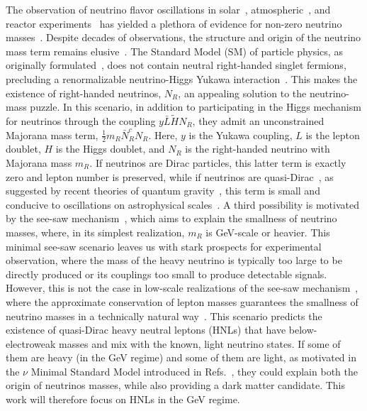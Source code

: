 \documentclass[
    aps,
    prd,
    reprint,
    amsmath,
    amssymb,
    nofootinbib,
    superscriptaddress,
    floatfix
]{revtex4-2}
\begin{document}
The observation of neutrino flavor oscillations in solar~\cite{Cleveland:1998nv, Super-Kamiokande:2001ljr, Borexino:2008dzn, Gann:2021ndb}, atmospheric~\cite{Super-Kamiokande:1998kpq, IceCube:2013pav, ANTARES:2018rtf, IceCubeCollaboration:2023wtb, Arguelles:2022hrt}, and reactor experiments~\cite{DayaBay:2012fng, RENO:2012mkc, Vogel:2015wua} has yielded a plethora of evidence for non-zero neutrino masses~\cite{Esteban:2018azc}.
Despite decades of observations, the structure and origin of the neutrino mass term remains elusive~\cite{Mohapatra:2005wg}.
The Standard Model (SM) of particle physics, as originally formulated~\cite{Weinberg:1967tq, Weinberg:2004kv}, does not contain neutral right-handed singlet fermions, precluding a renormalizable neutrino-Higgs Yukawa interaction~\cite{Higgs:1964pj}.
This makes the existence of right-handed neutrinos, $N_R$, an appealing solution to the neutrino-mass puzzle.
In this scenario, in addition to participating in the Higgs mechanism for neutrinos through the coupling $y \bar L \tilde H N_R$, they admit an unconstrained Majorana mass term, $\frac{1}{2} m_R \bar N_R^c N_R$.
Here, $y$ is the Yukawa coupling, $L$ is the lepton doublet, $H$ is the Higgs doublet, and $N_R$ is the right-handed neutrino with Majorana mass $m_R$.
If neutrinos are Dirac particles, this latter term is exactly zero and lepton number is preserved, while if neutrinos are quasi-Dirac~\cite{Valle:1983dk}, as suggested by recent theories of quantum gravity~\cite{Ooguri:2016pdq, Arkani-Hamed:2007ryu, Gonzalo:2021zsp, Vafa:2024fpx}, this term is small and conducive to oscillations on astrophysical scales~\cite{Crocker:2001zs, Keranen:2003xd,Beacom:2003eu, Esmaili:2009fk, Esmaili:2012ac, Shoemaker:2015qul, Carloni:2022cqz}.
A third possibility is motivated by the see-saw mechanism~\cite{Minkowski:1977sc, Mohapatra:1979ia, GellMann:1980vs, Yanagida:1979as, Lazarides:1980nt, Mohapatra:1980yp, Schechter:1980gr, Cheng:1980qt, Foot:1988aq}, which aims to explain the smallness of neutrino masses, where, in its simplest realization, $m_R$ is GeV-scale or heavier.
This minimal see-saw scenario leaves us with stark prospects for experimental observation, where the mass of the heavy neutrino is typically too large to be directly produced or its couplings too small to produce detectable signals.
However, this is not the case in low-scale realizations of the see-saw mechanism~\cite{Mohapatra:1986bd, GonzalezGarcia:1988rw,Wyler:1982dd, Akhmedov:1995ip, Akhmedov:1995vm,Barry:2011wb, Zhang:2011vh}, where the approximate conservation of lepton masses guarantees the smallness of neutrino masses in a technically natural way~\cite{naturalness_tHooft, Vissani:1997ys}.
This scenario predicts the existence of quasi-Dirac heavy neutral leptons (HNLs) that have below-electroweak masses and mix with the known, light neutrino states.
If some of them are heavy (in the GeV regime) and some of them are light, as motivated in the $\nu$ Minimal Standard Model introduced in Refs.~\cite{ASAKA200517, ASAKA2005151},
they could explain both the origin of neutrinos masses, while also providing a dark matter candidate. This work will therefore focus on HNLs in the GeV regime.
\end{document}
